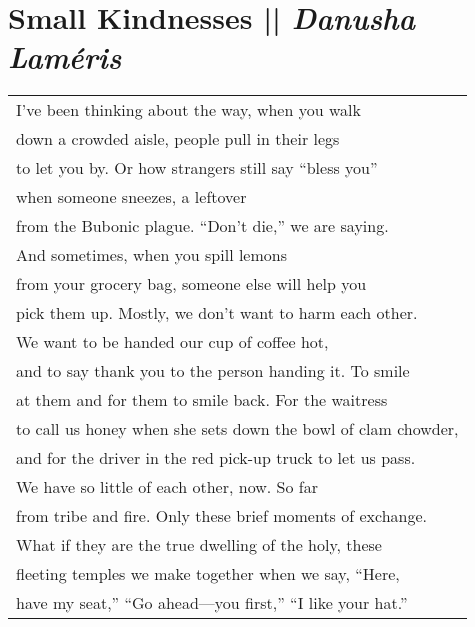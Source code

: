 \section[Small Kindnesses]{Small Kindnesses || \emph{Danusha Laméris} \hspace*{\fill}  \thepage}
\hspace{0pt}
\vfill
\begin{center}
\begin{tabular}{l}
I’ve been thinking about the way, when you walk\\
down a crowded aisle, people pull in their legs\\
to let you by. Or how strangers still say “bless you”\\
when someone sneezes, a leftover\\
from the Bubonic plague. “Don’t die,” we are saying.\\
And sometimes, when you spill lemons\\
from your grocery bag, someone else will help you\\
pick them up. Mostly, we don’t want to harm each other.\\
We want to be handed our cup of coffee hot,\\
and to say thank you to the person handing it. To smile\\
at them and for them to smile back. For the waitress\\
to call us honey when she sets down the bowl of clam chowder,\\
and for the driver in the red pick-up truck to let us pass.\\
We have so little of each other, now. So far\\
from tribe and fire. Only these brief moments of exchange.\\
What if they are the true dwelling of the holy, these\\
fleeting temples we make together when we say, “Here,\\
have my seat,” “Go ahead—you first,” “I like your hat.”
\end{tabular}
\end{center}
\vfill
\hspace{0pt}